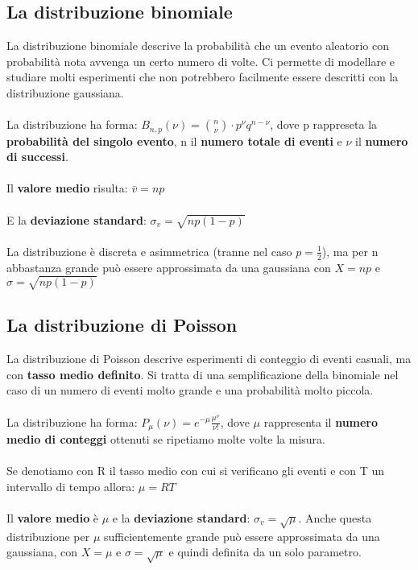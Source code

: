 \documentclass{article}
\begin{document}
\subsection{La distribuzione binomiale}
La distribuzione binomiale descrive la probabilità che un evento aleatorio con probabilità nota avvenga un certo numero di volte. Ci permette di modellare e studiare molti esperimenti che non potrebbero facilmente essere descritti con la distribuzione gaussiana.\\\\
La distribuzione ha forma:
$B_{n,p}(\nu) = \binom{n}{\nu} \cdot p^\nu q^{n - \nu}$, dove p rappreseta la \textbf{probabilità del singolo evento}, n il \textbf{numero totale di eventi} e $\nu$ il \textbf{numero di successi}.\\\\
Il \textbf{valore medio} risulta: $\bar{v} = np$\\\\
E la \textbf{deviazione standard}: $\sigma_v = \sqrt{np(1-p)}$\\\\
La distribuzione è discreta e asimmetrica (tranne nel caso $p=\frac{1}{2}$), ma per n abbastanza grande può essere approssimata da una gaussiana con $X=np$ e $\sigma = \sqrt{np(1-p)}$

\subsection{La distribuzione di Poisson}
La distribuzione di Poisson descrive esperimenti di conteggio di eventi casuali, ma con \textbf{tasso medio definito}. Si tratta di una semplificazione della binomiale nel caso di un numero di eventi molto grande e una probabilità molto
piccola.\\\\
La distribuzione ha forma: $P_\mu (\nu) = e^{-\mu} \frac{\mu^{\nu}}{\nu!}$, dove $\mu$ rappresenta il \textbf{numero medio di conteggi} ottenuti se ripetiamo molte volte la misura.\\\\
Se denotiamo con R il tasso medio con cui si verificano gli eventi e con T un intervallo di tempo allora: $\mu = RT$\\\\
Il \textbf{valore medio} è $\mu$ e la \textbf{deviazione standard}: $\sigma_v = \sqrt{\mu}$. Anche questa distribuzione per $\mu$ sufficientemente grande può essere approssimata da una gaussiana, con $X=\mu$ e $\sigma = \sqrt{\mu}$ e quindi definita da un solo parametro.
\end{document}
